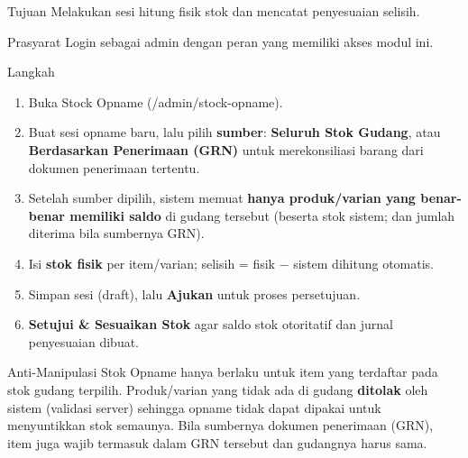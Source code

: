 
\begin{flowsection}{Tujuan}
Melakukan sesi hitung fisik stok dan mencatat penyesuaian selisih.
\end{flowsection}

\begin{flowsection}{Prasyarat}
Login sebagai admin dengan peran yang memiliki akses modul ini.
\end{flowsection}

\begin{flowsection}{Langkah}
\begin{enumerate}
  \item Buka Stock Opname (/admin/stock-opname).
  \item Buat sesi opname baru, lalu pilih \textbf{sumber}:
        \textbf{Seluruh Stok Gudang}, atau \textbf{Berdasarkan Penerimaan (GRN)}
        untuk merekonsiliasi barang dari dokumen penerimaan tertentu.
  \item Setelah sumber dipilih, sistem memuat \textbf{hanya produk/varian yang
        benar-benar memiliki saldo} di gudang tersebut (beserta stok sistem; dan
        jumlah diterima bila sumbernya GRN).
  \item Isi \textbf{stok fisik} per item/varian; selisih = fisik $-$ sistem
        dihitung otomatis.
  \item Simpan sesi (draft), lalu \textbf{Ajukan} untuk proses persetujuan.
  \item \textbf{Setujui \& Sesuaikan Stok} agar saldo stok otoritatif dan jurnal
        penyesuaian dibuat.
\end{enumerate}
\end{flowsection}

\begin{flowsection}{Anti-Manipulasi Stok}
Opname hanya berlaku untuk item yang terdaftar pada stok gudang terpilih.
Produk/varian yang tidak ada di gudang \textbf{ditolak} oleh sistem (validasi
server) sehingga opname tidak dapat dipakai untuk menyuntikkan stok semaunya.
Bila sumbernya dokumen penerimaan (GRN), item juga wajib termasuk dalam GRN
tersebut dan gudangnya harus sama.
\end{flowsection}


